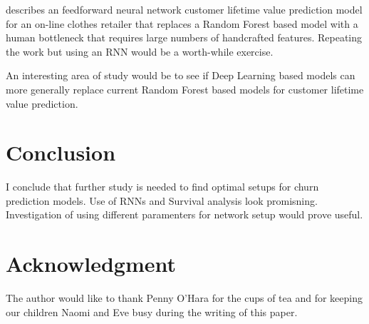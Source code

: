 \documentclass[final,a4paper,peerreviewca]{IEEEtran}
\begin{document}
\cite{Chamberlain:2017} describes an feedforward neural network customer lifetime value prediction model for an on-line clothes retailer that replaces a Random Forest based model with a human bottleneck that requires large numbers of handcrafted features. Repeating the work but using an RNN would be a worth-while exercise.

An interesting area of study would be to see if Deep Learning based models can more generally replace current Random Forest based models for customer lifetime value prediction.




\section{Conclusion}
I conclude that further study is needed to find optimal setups for churn prediction models. Use of RNNs and Survival analysis look promisning. Investigation of using different paramenters for network setup would prove useful.


\section*{Acknowledgment}
The author would like to thank Penny O'Hara for the cups of tea and for keeping our children Naomi and Eve busy during the writing of this paper.


\ifCLASSOPTIONcaptionsoff
  \newpage
\fi


%
\medskip




\vfill
\end{document}
